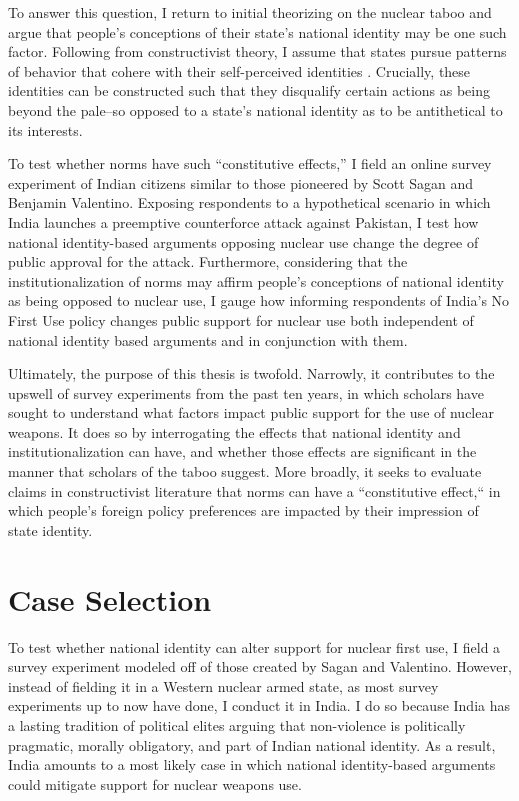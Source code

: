 \documentclass[12pt]{article}
\begin{document}
To answer this question, I return to initial theorizing on the nuclear taboo and argue that people's conceptions of their state's national identity may be one such factor. Following from constructivist theory, I assume that states pursue patterns of behavior that cohere with their self-perceived identities \citep{tannenwald_nuclear_2007,wendt_social_1999}. Crucially, these identities can be constructed such that they disqualify certain actions as being beyond the pale--so opposed to a state's national identity as to be antithetical to its interests.

To test whether norms have such “constitutive effects,” I field an online survey experiment of Indian citizens similar to those pioneered by Scott Sagan and Benjamin Valentino. Exposing respondents to a hypothetical scenario in which India launches a preemptive counterforce attack against Pakistan, I test how national identity-based arguments opposing nuclear use change the degree of public approval for the attack. Furthermore, considering that the institutionalization of norms may affirm people's conceptions of national identity as being opposed to nuclear use, I gauge how informing respondents of India's No First Use policy changes public support for nuclear use both independent of national identity based arguments and in conjunction with them.

Ultimately, the purpose of this thesis is twofold. Narrowly, it contributes to the upswell of survey experiments from the past ten years, in which scholars have sought to understand what factors impact public support for the use of nuclear weapons. It does so by interrogating the effects that national identity and institutionalization can have, and whether those effects are significant in the manner that scholars of the taboo suggest. More broadly, it seeks to evaluate claims in constructivist literature that norms can have a “constitutive effect,“ in which people's foreign policy preferences are impacted by their impression of state identity.

\section{Case Selection}
To test whether national identity can alter support for nuclear first use, I field a survey experiment modeled off of those created by Sagan and Valentino. However, instead of fielding it in a Western nuclear armed state, as most survey experiments up to now have done, I conduct it in India. I do so because India has a lasting tradition of political elites arguing that non-violence is politically pragmatic, morally obligatory, and part of Indian national identity. As a result, India amounts to a most likely case in which national identity-based arguments could mitigate support for nuclear weapons use.
\end{document}
